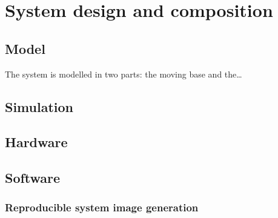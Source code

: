 \section{System design and composition}
\subsection{Model}
The system is modelled in two parts: the moving base and the\ldots

\subsection{Simulation}

\subsection{Hardware}

\subsection{Software}
\subsubsection{Reproducible system image generation}

